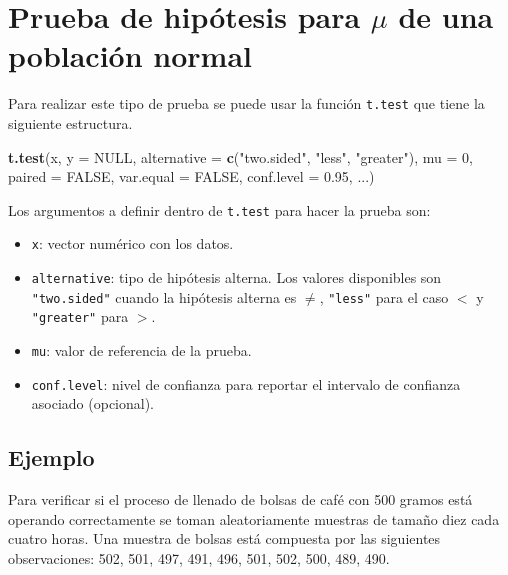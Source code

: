 \documentclass[10pt,]{krantz}
\makeatletter
\newenvironment{Shaded}{\begin{snugshade}}{\end{snugshade}}
\newcommand{\KeywordTok}[1]{\textcolor[rgb]{0.13,0.29,0.53}{\textbf{#1}}}
\newcommand{\DataTypeTok}[1]{\textcolor[rgb]{0.13,0.29,0.53}{#1}}
\newcommand{\DecValTok}[1]{\textcolor[rgb]{0.00,0.00,0.81}{#1}}
\newcommand{\FloatTok}[1]{\textcolor[rgb]{0.00,0.00,0.81}{#1}}
\newcommand{\StringTok}[1]{\textcolor[rgb]{0.31,0.60,0.02}{#1}}
\newcommand{\OtherTok}[1]{\textcolor[rgb]{0.56,0.35,0.01}{#1}}
\newcommand{\NormalTok}[1]{#1}
\providecommand{\tightlist}{%
  \setlength{\itemsep}{0pt}\setlength{\parskip}{0pt}}
\newenvironment{kframe}{%
\medskip{}
\setlength{\fboxsep}{.8em}
 \def\at@end@of@kframe{}%
 \ifinner\ifhmode%
  \def\at@end@of@kframe{\end{minipage}}%
  \begin{minipage}{\columnwidth}%
 \fi\fi%
 \def\FrameCommand##1{\hskip\@totalleftmargin \hskip-\fboxsep
 \colorbox{shadecolor}{##1}\hskip-\fboxsep
     \hskip-\linewidth \hskip-\@totalleftmargin \hskip\columnwidth}%
 \MakeFramed {\advance\hsize-\width
   \@totalleftmargin\z@ \linewidth\hsize
   \@setminipage}}%
 {\par\unskip\endMakeFramed%
 \at@end@of@kframe}
\renewenvironment{Shaded}{\begin{kframe}}{\end{kframe}}
\makeatother
\begin{document}
\section{\texorpdfstring{Prueba de hipótesis para \(\mu\) de una
población
normal}{Prueba de hipótesis para \textbackslash{}mu de una población normal}}\label{prueba-de-hipotesis-para-mu-de-una-poblacion-normal}

Para realizar este tipo de prueba se puede usar la función
\texttt{t.test} que tiene la siguiente estructura.

\begin{Shaded}
\begin{Highlighting}[]
\KeywordTok{t.test}\NormalTok{(x, }\DataTypeTok{y =} \OtherTok{NULL}\NormalTok{,}
       \DataTypeTok{alternative =} \KeywordTok{c}\NormalTok{(}\StringTok{"two.sided"}\NormalTok{, }\StringTok{"less"}\NormalTok{, }\StringTok{"greater"}\NormalTok{),}
       \DataTypeTok{mu =} \DecValTok{0}\NormalTok{, }\DataTypeTok{paired =} \OtherTok{FALSE}\NormalTok{, }\DataTypeTok{var.equal =} \OtherTok{FALSE}\NormalTok{,}
       \DataTypeTok{conf.level =} \FloatTok{0.95}\NormalTok{, ...)}
\end{Highlighting}
\end{Shaded}

Los argumentos a definir dentro de \texttt{t.test} para hacer la prueba
son:

\begin{itemize}
\tightlist
\item
  \texttt{x}: vector numérico con los datos.
\item
  \texttt{alternative}: tipo de hipótesis alterna. Los valores
  disponibles son \texttt{"two.sided"} cuando la hipótesis alterna es
  \(\neq\), \texttt{"less"} para el caso \(<\) y \texttt{"greater"} para
  \(>\).
\item
  \texttt{mu}: valor de referencia de la prueba.
\item
  \texttt{conf.level}: nivel de confianza para reportar el intervalo de
  confianza asociado (opcional).
\end{itemize}

\subsection*{Ejemplo}\label{ejemplo-63}


Para verificar si el proceso de llenado de bolsas de café con 500 gramos
está operando correctamente se toman aleatoriamente muestras de tamaño
diez cada cuatro horas. Una muestra de bolsas está compuesta por las
siguientes observaciones: 502, 501, 497, 491, 496, 501, 502, 500, 489,
490.
\end{document}
